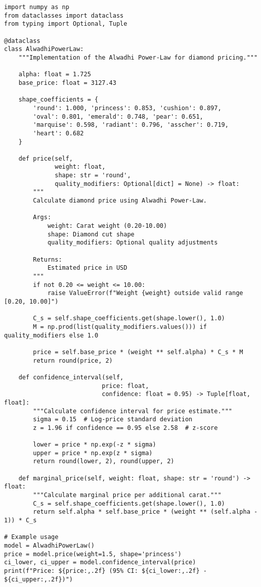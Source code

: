 \documentclass[12pt,a4paper]{article}
\theoremstyle{definition}
\theoremstyle{remark}
\begin{document}
\begin{verbatim}
import numpy as np
from dataclasses import dataclass
from typing import Optional, Tuple

@dataclass
class AlwadhiPowerLaw:
    """Implementation of the Alwadhi Power-Law for diamond pricing."""
    
    alpha: float = 1.725
    base_price: float = 3127.43
    
    shape_coefficients = {
        'round': 1.000, 'princess': 0.853, 'cushion': 0.897,
        'oval': 0.801, 'emerald': 0.748, 'pear': 0.651,
        'marquise': 0.598, 'radiant': 0.796, 'asscher': 0.719,
        'heart': 0.682
    }
    
    def price(self, 
              weight: float, 
              shape: str = 'round',
              quality_modifiers: Optional[dict] = None) -> float:
        """
        Calculate diamond price using Alwadhi Power-Law.
        
        Args:
            weight: Carat weight (0.20-10.00)
            shape: Diamond cut shape
            quality_modifiers: Optional quality adjustments
            
        Returns:
            Estimated price in USD
        """
        if not 0.20 <= weight <= 10.00:
            raise ValueError(f"Weight {weight} outside valid range [0.20, 10.00]")
            
        C_s = self.shape_coefficients.get(shape.lower(), 1.0)
        M = np.prod(list(quality_modifiers.values())) if quality_modifiers else 1.0
        
        price = self.base_price * (weight ** self.alpha) * C_s * M
        return round(price, 2)
    
    def confidence_interval(self, 
                           price: float, 
                           confidence: float = 0.95) -> Tuple[float, float]:
        """Calculate confidence interval for price estimate."""
        sigma = 0.15  # Log-price standard deviation
        z = 1.96 if confidence == 0.95 else 2.58  # z-score
        
        lower = price * np.exp(-z * sigma)
        upper = price * np.exp(z * sigma)
        return round(lower, 2), round(upper, 2)
    
    def marginal_price(self, weight: float, shape: str = 'round') -> float:
        """Calculate marginal price per additional carat."""
        C_s = self.shape_coefficients.get(shape.lower(), 1.0)
        return self.alpha * self.base_price * (weight ** (self.alpha - 1)) * C_s

# Example usage
model = AlwadhiPowerLaw()
price = model.price(weight=1.5, shape='princess')
ci_lower, ci_upper = model.confidence_interval(price)
print(f"Price: ${price:,.2f} (95% CI: ${ci_lower:,.2f} - ${ci_upper:,.2f})")
\end{verbatim}
\end{document}
